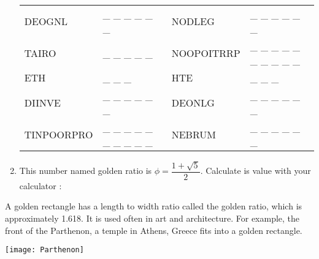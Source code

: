 \begin{enumerate}
\begin{center}
\begin{tabular}{|p{2cm}p{4cm}|p{2cm}p{4cm}|}
         DEOGNL & \_ \_ \_ \_ \_ \_ & NODLEG & \_ \_ \_ \_ \_ \_ \\
         TAIRO & \_ \_ \_ \_ \_ & NOOPOITRRP & \_ \_ \_ \_ \_ \_ \_ \_ \_ \_ \\
         \hline
         ETH & \_ \_ \_ & HTE & \_ \_ \_ \\
         DIINVE & \_ \_ \_ \_ \_ \_ & DEONLG & \_ \_ \_ \_ \_ \_ \\
         TINPOORPRO & \_ \_ \_ \_ \_ \_ \_ \_ \_ \_ & NEBRUM & \_ \_ \_ \_ \_ \_ \\
         \hline
      \end{tabular}
   \end{center}
   \smallskip
   \item This number named golden ratio is $\phi =\dfrac{1+\sqrt5}{2}$. Calculate is value with your calculator : \pfb
\end{enumerate}

\vfill

\begin{minipage}{10cm}
   A golden rectangle has a length to width ratio called the golden ratio, which is approximately 1.618. It is used often in art and architecture. For example, the front of the Parthenon, a temple in Athens, Greece fits into a golden rectangle.
\end{minipage}
\qquad
\begin{minipage}{5cm}
   \texttt{[image: Parthenon]}
\end{minipage}
   

